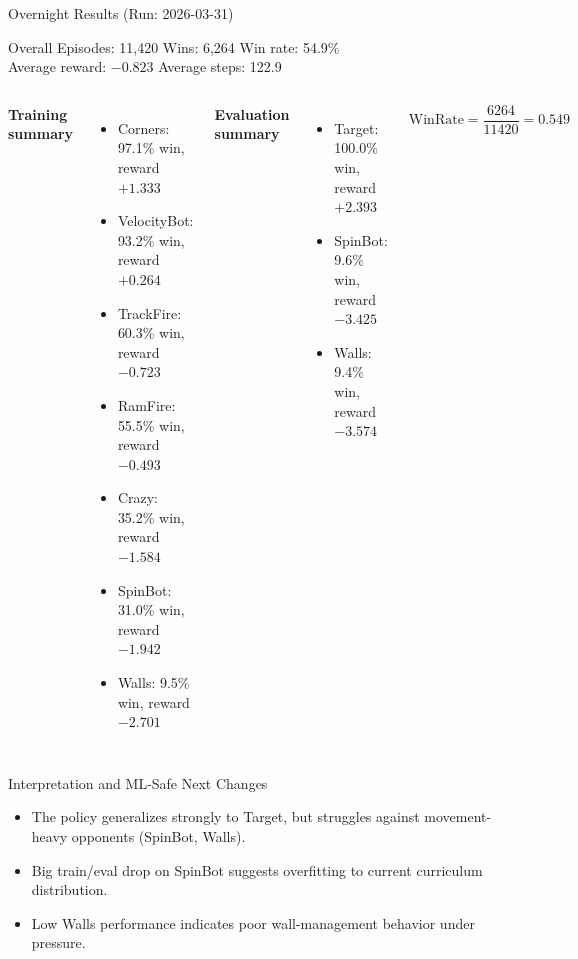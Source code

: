 \documentclass[12pt,aspectratio=169]{beamer}
\begin{document}
\begin{frame}{Overnight Results (Run: 2026-03-31)}
\small
\begin{block}{Overall}
Episodes: 11,420 \hfill Wins: 6,264 \hfill Win rate: 54.9\%\\
Average reward: $-0.823$ \hfill Average steps: 122.9
\end{block}

\vspace{0.1cm}
\begin{columns}[T,totalwidth=\textwidth]
\textbf{Training summary}
\begin{itemize}
  \item Corners: 97.1\% win, reward $+1.333$
  \item VelocityBot: 93.2\% win, reward $+0.264$
  \item TrackFire: 60.3\% win, reward $-0.723$
  \item RamFire: 55.5\% win, reward $-0.493$
  \item Crazy: 35.2\% win, reward $-1.584$
  \item SpinBot: 31.0\% win, reward $-1.942$
  \item Walls: 9.5\% win, reward $-2.701$
\end{itemize}

\textbf{Evaluation summary}
\begin{itemize}
  \item Target: 100.0\% win, reward $+2.393$
  \item SpinBot: 9.6\% win, reward $-3.425$
  \item Walls: 9.4\% win, reward $-3.574$
\end{itemize}

\vspace{0.15cm}
\[
\text{WinRate}=\frac{6264}{11420}=0.549
\]
\end{columns}
\end{frame}

\begin{frame}{Interpretation and ML-Safe Next Changes}
\begin{itemize}
  \item The policy generalizes strongly to Target, but struggles against movement-heavy opponents (SpinBot, Walls).
  \item Big train/eval drop on SpinBot suggests overfitting to current curriculum distribution.
  \item Low Walls performance indicates poor wall-management behavior under pressure.
\end{itemize}
\end{frame}
\end{document}
